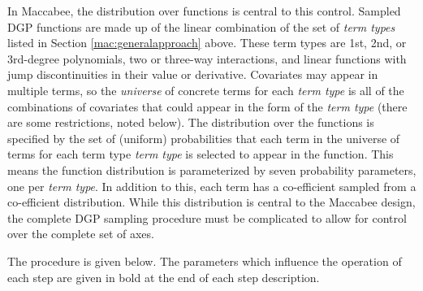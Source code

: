 \documentclass[../main.tex]{subfiles}
\begin{document}
\vspace{\baselineskip}

In Maccabee, the distribution over functions is central to this control. Sampled DGP functions are made up of the linear combination of the set of \textit{term types} listed in Section \ref{mac:generalapproach} above. These term types are 1st, 2nd, or 3rd-degree polynomials, two or three-way interactions, and linear functions with jump discontinuities in their value or derivative. Covariates may appear in multiple terms, so the \textit{universe} of concrete terms for each \textit{term type} is all of the combinations of covariates that could appear in the form of the \textit{term type} (there are some restrictions, noted below). The distribution over the functions is specified by the set of (uniform) probabilities that each term in the universe of terms for each term type \textit{term type} is selected to appear in the function. This means the function distribution is parameterized by seven probability parameters, one per \textit{term type}. In addition to this, each term has a co-efficient sampled from a co-efficient distribution. While this distribution is central to the Maccabee design, the complete DGP sampling procedure must be complicated to allow for control over the complete set of axes.

\vspace{\baselineskip}

The procedure is given below. The parameters which influence the operation of each step are given in bold at the end of each step description.
\end{document}
